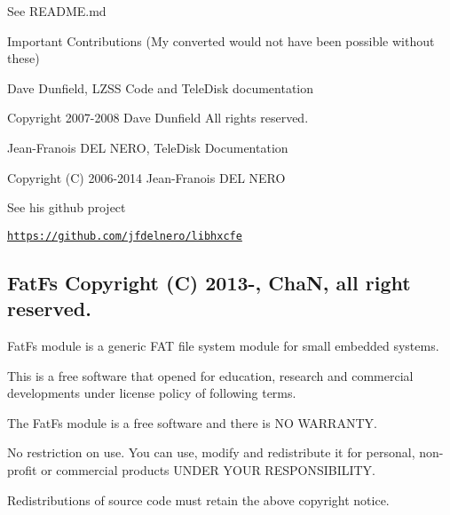 \begin{DoxyItemize}
\item See R\+E\+A\+D\+ME.md
\begin{DoxyItemize}
\item Important Contributions (My converted would not have been possible without these)
\begin{DoxyItemize}
\item Dave Dunfield, L\+Z\+SS Code and Tele\+Disk documentation
\begin{DoxyItemize}
\item Copyright 2007-\/2008 Dave Dunfield All rights reserved.
\end{DoxyItemize}
\item Jean-\/\+Franois D\+EL N\+E\+RO, Tele\+Disk Documentation
\begin{DoxyItemize}
\item Copyright (C) 2006-\/2014 Jean-\/\+Franois D\+EL N\+E\+RO
\item See his github project
\begin{DoxyItemize}
\item \href{https://github.com/jfdelnero/libhxcfe}{\tt https\+://github.\+com/jfdelnero/libhxcfe} 


\end{DoxyItemize}
\end{DoxyItemize}
\end{DoxyItemize}
\end{DoxyItemize}
\end{DoxyItemize}

\subsection*{Fat\+Fs Copyright (C) 2013-\/, ChaN, all right reserved.}

Fat\+Fs module is a generic F\+AT file system module for small embedded systems.

This is a free software that opened for education, research and commercial developments under license policy of following terms.


\begin{DoxyItemize}
\item The Fat\+Fs module is a free software and there is NO W\+A\+R\+R\+A\+N\+TY.
\item No restriction on use. You can use, modify and redistribute it for personal, non-\/profit or commercial products U\+N\+D\+ER Y\+O\+UR R\+E\+S\+P\+O\+N\+S\+I\+B\+I\+L\+I\+TY.
\item Redistributions of source code must retain the above copyright notice.
\end{DoxyItemize}





